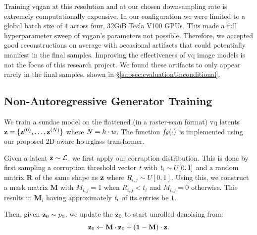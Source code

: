 Training \gls{vqgan} at this resolution and at our chosen downsampling rate is
extremely computationally expensive. In our configuration we were limited to a
global batch size of 4 across four, 32GiB Tesla V100 GPUs. This made a full
hyperparameter sweep of \gls{vqgan}'s parameters not possible. Therefore, we
accepted good reconstructions on average with occasional artifacts that could
potentially manifest in the final samples. Improving the effectiveness of \gls{vq}
image models is not the focus of this research project. We
found these artifacts to only appear rarely in the final samples, shown in
\S\ref{subsec:evaluationUnconditional}.

\subsection{Non-Autoregressive Generator Training}
\label{subsec:sundaeTraining}

We train a \gls{sundae} model on the flattened (in a raster-scan format)
\gls{vq} latents $\mathbf{z} = \{\mathbf{z}^{(0)}, \dots, \mathbf{z}^{(N)}\}$
where $N = h \cdot w$. The function $f_\theta(\cdot)$ is
implemented using our proposed 2D-aware hourglass transformer. 

Given a latent $\mathbf{z} \sim \mathcal{L}$, we first apply our corruption
distribution. This is done by first sampling a corruption threshold vector
$\textit{t}$ with $\textit{t}_i \sim U[0, 1]$ and a random
matrix $\mathbf{R}$ of the same shape as $\mathbf{z}$ where $R_{i,j} \sim U[0,1]$.
Using this, we construct a mask matrix $\mathbf{M}$ with $M_{i,j} = 1$ when
$R_{i,j} < t_i$ and $M_{i,j} = 0$ otherwise. This results in $\mathbf{M}_i$ having
approximately $\textit{t}_i$ of its entries be $1$.

Then, given $\mathbf{z}_0 \sim p_0$, we update the $\mathbf{z}_0$ to start unrolled
denoising from:
\begin{equation}
    \mathbf{z}_0 \leftarrow \mathbf{M} \cdot \mathbf{z}_0 + (\mathbf{1} - \mathbf{M})
    \cdot \mathbf{z} \text{.}
\end{equation}


